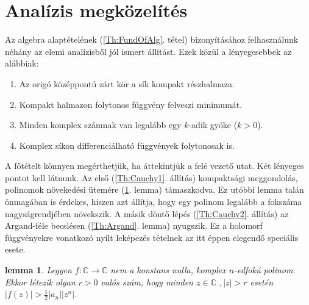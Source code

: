 \documentclass[a4paper, showtrims]{memoir}
\theoremstyle{plain}
\newtheorem{lemma}[proposition]{lemma}
\theoremstyle{remark}
\theoremstyle{definition}
\begin{document}
\section{Analízis megközelítés}
Az algebra alaptételének (\ref{Th:FundOfAlg}. tétel) bizonyításához felhasználunk néhány az elemi analízisből
jól ismert állítást.
Ezek közül a lényegesebbek az alábbiak:
\begin{enumerate}
	\item  Az origó középpontú zárt kör a sík
	      kompakt részhalmaza.

	\item  Kompakt halmazon folytonos függvény felveszi minimumát.

	\item  Minden komplex számnak van legalább egy $k$-adik gyöke ($k>0$).

	\item  Komplex síkon differenciálható függvények
	      folytonosak is.
\end{enumerate}

A főtételt könnyen megérthetjük, ha áttekintjük
a felé vezető utat.
Két lényeges pontot kell látnunk.
Az első (\ref{Th:Cauchy1}. állítás) kompaktsági meggondolás, polinomok növekedési ütemére (\ref{Th:Grow}. lemma) támaszkodva.
Ez utóbbi lemma talán önmagában is érdekes, hiszen azt állítja, hogy egy polinom legalább a fokszáma nagyságrendjében növekszik.
A másik döntő lépés (\ref{Th:Cauchy2}. állítás) az Argand-féle becslésen (\ref{Th:Argand}. lemma) nyugszik.
Ez a holomorf függvényekre vonatkozó nyílt leképezés tételnek az itt éppen elegendő speciális esete.

\begin{lemma}
	\label{Th:Grow}Legyen $f:\mathbb{C}\rightarrow \mathbb{C}$ nem a konstans nulla,
	komplex $n$-edfokú polinom.
	Ekkor létezik olyan $r>0$ valós szám, hogy minden $z\in \mathbb{C}$ $,\left| z\right| >r$ esetén $\left| f\left( z\right) \right| >\frac{1}{2}\left| a_{n}\right| \left|
		z^{n}\right| $.
\end{lemma}
\end{document}
